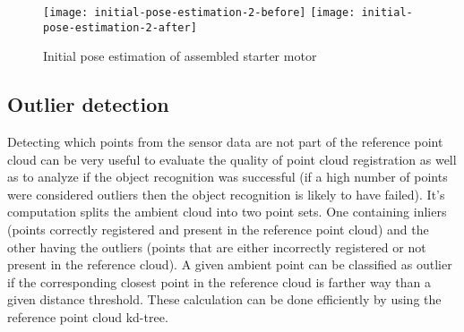 
\begin{figure}[!ht]
	\centering
	\texttt{[image: initial-pose-estimation-2-before]}
	\hspace{0.5em}
	\texttt{[image: initial-pose-estimation-2-after]}
	\caption{Initial pose estimation of assembled starter motor}
	\label{fig:initial-pose-estimation}
\end{figure}


\subsection{Outlier detection}

Detecting which points from the sensor data are not part of the reference point cloud can be very useful to evaluate the quality of point cloud registration as well as to analyze if the object recognition was successful (if a high number of points were considered outliers then the object recognition is likely to have failed). It's computation splits the ambient cloud into two point sets. One containing inliers (points correctly registered and present in the reference point cloud) and the other having the outliers (points that are either incorrectly registered or not present in the reference cloud). A given ambient point can be classified as outlier if the corresponding closest point in the reference cloud is farther way than a given distance threshold. These calculation can be done efficiently by using the reference point cloud kd-tree.
